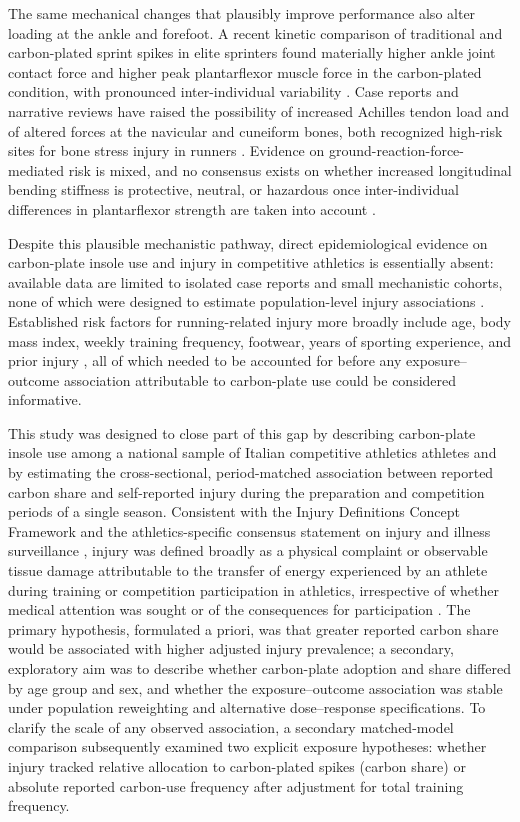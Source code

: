 The same mechanical changes that plausibly improve performance also alter loading at the ankle and forefoot. A recent kinetic comparison of traditional and carbon-plated sprint spikes in elite sprinters found materially higher ankle joint contact force and higher peak plantarflexor muscle force in the carbon-plated condition, with pronounced inter-individual variability \citep{gerlach2025aft}. Case reports and narrative reviews have raised the possibility of increased Achilles tendon load and of altered forces at the navicular and cuneiform bones, both recognized high-risk sites for bone stress injury in runners \citep{tenforde2023bonestress}. Evidence on ground-reaction-force-mediated risk is mixed, and no consensus exists on whether increased longitudinal bending stiffness is protective, neutral, or hazardous once inter-individual differences in plantarflexor strength are taken into account \citep{willwacher2016stiffness,gerlach2025aft}.

Despite this plausible mechanistic pathway, direct epidemiological evidence on carbon-plate insole use and injury in competitive athletics is essentially absent: available data are limited to isolated case reports and small mechanistic cohorts, none of which were designed to estimate population-level injury associations \citep{tenforde2023bonestress,gerlach2025aft}. Established risk factors for running-related injury more broadly include age, body mass index, weekly training frequency, footwear, years of sporting experience, and prior injury \citep{taunton2003running}, all of which needed to be accounted for before any exposure--outcome association attributable to carbon-plate use could be considered informative.

This study was designed to close part of this gap by describing carbon-plate insole use among a national sample of Italian competitive athletics athletes and by estimating the cross-sectional, period-matched association between reported carbon share and self-reported injury during the preparation and competition periods of a single season. Consistent with the Injury Definitions Concept Framework and the athletics-specific consensus statement on injury and illness surveillance \citep{timpka2014consensus,timpka2015meta}, injury was defined broadly as a physical complaint or observable tissue damage attributable to the transfer of energy experienced by an athlete during training or competition participation in athletics, irrespective of whether medical attention was sought or of the consequences for participation \citep{bahr2020strobesiis}. The primary hypothesis, formulated a priori, was that greater reported carbon share would be associated with higher adjusted injury prevalence; a secondary, exploratory aim was to describe whether carbon-plate adoption and share differed by age group and sex, and whether the exposure--outcome association was stable under population reweighting and alternative dose--response specifications. To clarify the scale of any observed association, a secondary matched-model comparison subsequently examined two explicit exposure hypotheses: whether injury tracked relative allocation to carbon-plated spikes (carbon share) or absolute reported carbon-use frequency after adjustment for total training frequency.
